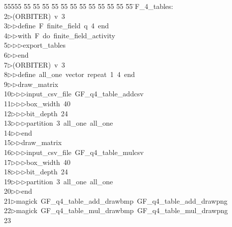 %
%
\begin{tabbing}
55555 \= 55 \= 55 \= 55 \= 55 \= 55 \= 55 \= 55 \= 55 \= 55 \= 55 \= 55 \= 55 \= \>F\_4\_tables:\\[0pt]
2\>$\triangleright$\>(ORBITER)\ v\ 3\ \\[0pt]
3\>$\triangleright$\>$\triangleright$\>define\ F\ finite\_field\ q\ 4\ end\ \\[0pt]
4\>$\triangleright$\>$\triangleright$\>with\ F\ do\ finite\_field\_activity\ \\[0pt]
5\>$\triangleright$\>$\triangleright$\>$\triangleright$\>export\_tables\ \\[0pt]
6\>$\triangleright$\>$\triangleright$\>end\\[0pt]
7\>$\triangleright$\>(ORBITER)\ v\ 3\ \\[0pt]
8\>$\triangleright$\>$\triangleright$\>define\ all\_one\ vector\ repeat\ 1\ 4\ end\ \\[0pt]
9\>$\triangleright$\>$\triangleright$\>draw\_matrix\ \\[0pt]
10\>$\triangleright$\>$\triangleright$\>$\triangleright$\>input\_csv\_file\ GF\_q4\_table\_addcsv\ \\[0pt]
11\>$\triangleright$\>$\triangleright$\>$\triangleright$\>box\_width\ 40\ \\[0pt]
12\>$\triangleright$\>$\triangleright$\>$\triangleright$\>bit\_depth\ 24\ \\[0pt]
13\>$\triangleright$\>$\triangleright$\>$\triangleright$\>partition\ 3\ all\_one\ all\_one\ \\[0pt]
14\>$\triangleright$\>$\triangleright$\>end\ \\[0pt]
15\>$\triangleright$\>$\triangleright$\>draw\_matrix\ \\[0pt]
16\>$\triangleright$\>$\triangleright$\>$\triangleright$\>input\_csv\_file\ GF\_q4\_table\_mulcsv\ \\[0pt]
17\>$\triangleright$\>$\triangleright$\>$\triangleright$\>box\_width\ 40\ \\[0pt]
18\>$\triangleright$\>$\triangleright$\>$\triangleright$\>bit\_depth\ 24\ \\[0pt]
19\>$\triangleright$\>$\triangleright$\>$\triangleright$\>partition\ 3\ all\_one\ all\_one\ \\[0pt]
20\>$\triangleright$\>$\triangleright$\>end\\[0pt]
21\>$\triangleright$\>magick\ GF\_q4\_table\_add\_drawbmp\ GF\_q4\_table\_add\_drawpng\\[0pt]
22\>$\triangleright$\>magick\ GF\_q4\_table\_mul\_drawbmp\ GF\_q4\_table\_mul\_drawpng\\[0pt]
23\>\end{tabbing}
